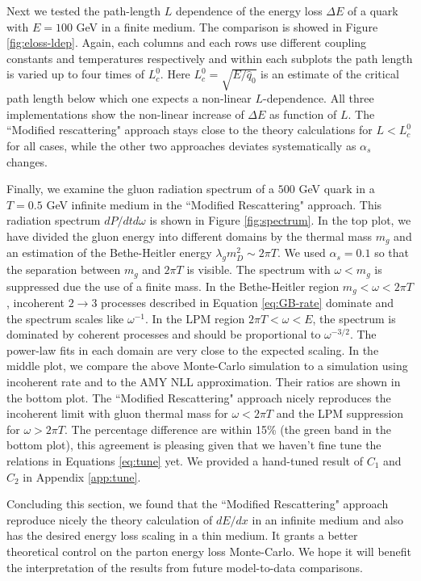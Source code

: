 \documentclass[aps, prc, reprint, amsmath, groupedaddress, nofootinbib]{revtex4-1}
\begin{document}
Next we tested the path-length $L$ dependence of the energy loss $\Delta E$ of a quark with $E = 100$ GeV in a finite medium.
The comparison is showed in Figure \ref{fig:eloss-ldep}.
Again, each columns and each rows use different coupling constants and temperatures respectively and within each subplots the path length is varied up to four times of $L_c^0$.
Here $L_c^0 = \sqrt{E/\hat{q}_0}$ is an estimate of the critical path length below which one expects a non-linear $L$-dependence.
All three implementations show the non-linear increase of $\Delta E$ as function of $L$.
The ``Modified rescattering" approach stays close to the theory calculations for $L<L_c^0$ for all cases, while the other two approaches deviates systematically as $\alpha_s$ changes.

Finally, we examine the gluon radiation spectrum of a $500$ GeV quark in a $T = 0.5$ GeV infinite medium in the ``Modified Rescattering" approach. 
This radiation spectrum $dP/dtd\omega$ is shown in Figure \ref{fig:spectrum}. 
In the top plot, we have divided the gluon energy into different domains by the thermal mass $m_g$ and an estimation of the Bethe-Heitler energy $\lambda_g m_D^2 \sim 2\pi T$.
We used $\alpha_s = 0.1$ so that the separation between $m_g$ and $2\pi T$ is visible.
The spectrum with $\omega < m_g$ is suppressed due the use of a finite mass.
In the Bethe-Heitler region $m_g < \omega < 2\pi T$, incoherent $2\rightarrow 3$ processes described in Equation \ref{eq:GB-rate} dominate and the spectrum scales like $\omega^{-1}$.
In the LPM region $2\pi T < \omega < E$, the spectrum is dominated by coherent processes and should be proportional to $\omega^{-3/2}$.
The power-law fits in each domain are very close to the expected scaling.
In the middle plot, we compare the above Monte-Carlo simulation to a simulation using incoherent rate and to the AMY NLL approximation. 
Their ratios are shown in the bottom plot.
The ``Modified Rescattering" approach nicely reproduces the incoherent limit with gluon thermal mass for $\omega < 2\pi T$ and the LPM suppression for $\omega > 2\pi T$. 
The percentage difference are within 15\% (the green band in the bottom plot), this agreement is pleasing given that we haven't fine tune the relations in Equations \ref{eq:tune} yet. 
We provided a hand-tuned result of $C_1$ and $C_2$ in Appendix \ref{app:tune}.

Concluding this section, we found that the ``Modified Rescattering" approach reproduce nicely the theory calculation of $dE/dx$ in an infinite medium and also has the desired energy loss scaling in a thin medium.
It grants a better theoretical control on the parton energy loss Monte-Carlo. 
We hope it will benefit the interpretation of the results from future model-to-data comparisons.
\end{document}
